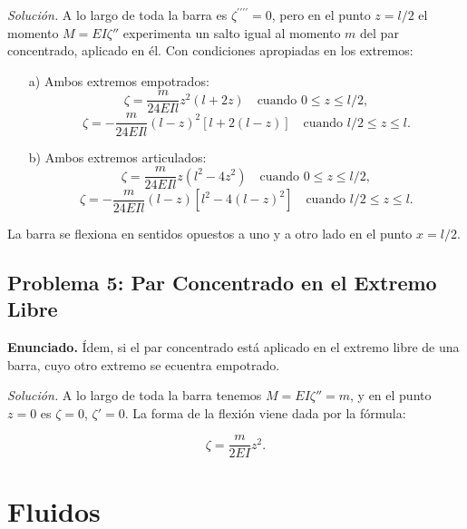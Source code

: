 \documentclass{article}
\begin{document}
\textit{Solución.} A lo largo de toda la barra es $\zeta^{\prime\prime\prime\prime} = 0$, pero en el punto $z = l/2$ el momento $M = EI\zeta''$ experimenta un salto igual al momento $m$ del par concentrado, aplicado en él. Con condiciones apropiadas en los extremos:

\begin{enumerate}
    \item[a)] Ambos extremos empotrados:
    $$
    \zeta = \frac{m}{24EIl} z^2(l + 2z) \quad \text{cuando } 0 \leq z \leq l/2,
    $$
    $$
    \zeta = -\frac{m}{24EIl} (l - z)^2[l + 2(l - z)] \quad \text{cuando } l/2 \leq z \leq l.
    $$

    \item[b)] Ambos extremos articulados:
    $$
    \zeta = \frac{m}{24EIl} z(l^2 - 4z^2) \quad \text{cuando } 0 \leq z \leq l/2,
    $$
    $$
    \zeta = -\frac{m}{24EIl} (l - z)[l^2 - 4(l - z)^2] \quad \text{cuando } l/2 \leq z \leq l.
    $$
\end{enumerate}
La barra se flexiona en sentidos opuestos a uno y a otro lado en el punto $x=l/2$.

\subsection*{Problema 5: Par Concentrado en el Extremo Libre}
\textbf{Enunciado.} Ídem, si el par concentrado está aplicado en el extremo libre de una barra, cuyo otro extremo se ecuentra empotrado.

\textit{Solución.} A lo largo de toda la barra tenemos $M = EI\zeta'' = m$, y en el punto $z = 0$ es $\zeta = 0$, $\zeta' = 0$. La forma de la flexión viene dada por la fórmula:

$$
\zeta = \frac{m}{2EI} z^2.
$$

\section*{Fluidos}
\end{document}
